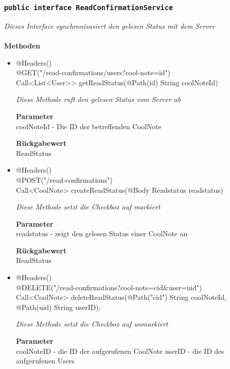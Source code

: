 	\subsubsection{\texttt{public interface  ReadConfirmationService }}
\textit{ Dieses Interface synchronisasiert den gelesen Status mit dem Server}\\
\\
	\textbf{Methoden} \\

    \begin{itemize}
		\item{@Headers()\\@GET("/read-confirmations/users?cool-note={id}") \\ Call<List<User>> getReadStatus(@Path(\grqq id\grqq) String coolNoteId)}

		\textit{Diese Methode ruft den gelesen Status vom Server ab}

		\textbf{Parameter} \\
	 coolNoteId - Die ID der betreffenden CoolNote

		\textbf{Rückgabewert} \\
	ReadStatus

	\item{@Headers()\\ @POST("/read-confirmations") \\ Call<CoolNote> createReadStatus(@Body Readstatus readstatus) } 

		\textit{Diese Methode setzt die Checkbox auf markiert}

		\textbf{Parameter} \\
	 readstatus - zeigt den gelesen Status einer CoolNote an

		\textbf{Rückgabewert} \\
	ReadStatus



	\item{@Headers()\\ @DELETE("/read-confirmations?cool-note={cid}\&user={uid}")}
\\Call<CoolNote> deleteReadStatus(@Path("cid") String coolNoteId,
			     @Path(\grqq uid\grqq) String userID);

		\textit{Diese Methode setzt die Checkbox auf unmarkiert}

		\textbf{Parameter} \\
	coolNoteID - die ID der aufgerufenen CoolNote
	userID - die ID des aufgerufenen Users



	 \end{itemize}



